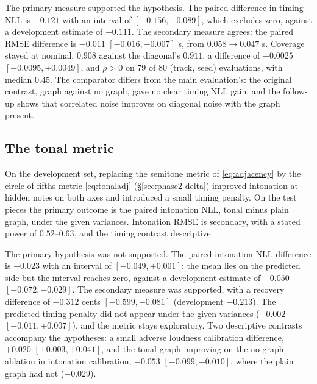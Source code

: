 \documentclass[11pt,a4paper]{report}
\begin{document}
The primary measure supported the hypothesis. The paired difference in
timing NLL is $-0.121$ with an interval of $[-0.156, -0.089]$, which
excludes zero, against a development estimate of $-0.111$. The secondary
measure agrees: the paired RMSE difference is $-0.011$
$[-0.016, -0.007]$ s, from $0.058 \to 0.047$ s. Coverage stayed at
nominal, $0.908$ against the diagonal's $0.911$, a difference of $-0.0025$
$[-0.0095, +0.0049]$, and $\rho > 0$ on 79 of 80 (track, seed) evaluations,
with median $0.45$. The comparator differs from the main
evaluation's: the original contrast, graph against no graph, gave no clear
timing NLL gain, and the follow-up shows that correlated noise
improves on diagonal noise with the graph present.

\subsection{The tonal metric}
On the development set, replacing the semitone metric of
\eqref{eq:adjacency} by the circle-of-fifths metric \eqref{eq:tonaladj}
(\S\ref{sec:phase2-delta}) improved intonation at hidden notes on both axes
and introduced a small timing penalty. On the test pieces the primary outcome
is the paired intonation NLL, tonal minus plain graph, under the given
variances. Intonation RMSE is secondary, with a stated power of
$0.52$--$0.63$, and the timing contrast descriptive.

The primary hypothesis was not supported. The paired intonation NLL
difference is $-0.023$ with an interval of $[-0.049, +0.001]$: the mean
lies on the predicted side but the interval reaches zero, against a
development estimate of $-0.050$ $[-0.072, -0.029]$. The secondary measure
was supported, with a recovery difference of $-0.312$ cents
$[-0.599, -0.081]$ (development $-0.213$). The predicted timing penalty
did not appear under the given variances ($-0.002$ $[-0.011, +0.007]$),
and the metric stays exploratory. Two descriptive contrasts accompany the
hypotheses: a small adverse loudness calibration difference, $+0.020$
$[+0.003, +0.041]$, and the tonal graph improving on the no-graph ablation
in intonation calibration, $-0.053$ $[-0.099, -0.010]$, where the plain
graph had not ($-0.029$).

\end{document}
